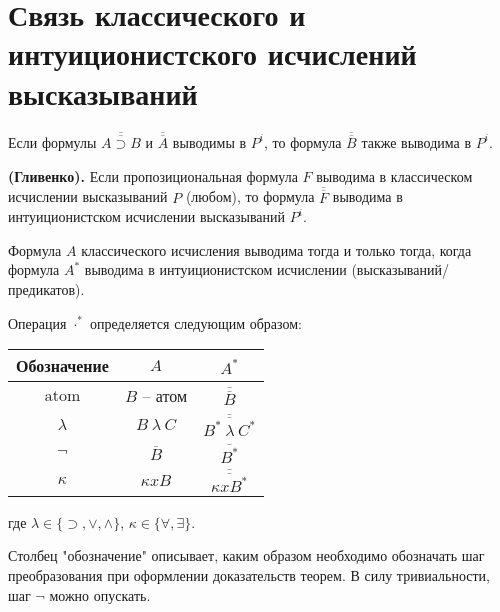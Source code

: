 \section{Связь классического и интуиционистского исчислений высказываний}

\begin{lemma}
    Если формулы $\overline{\overline{A \supset B}}$ и $\overline{\overline{A}}$ выводимы в $P^i$, то формула $\overline{\overline{B}}$ также выводима в $P^i$.
\end{lemma}

\begin{theorem}
    \textbf{(Гливенко).} Если пропозициональная формула $F$ выводима в классическом исчислении высказываний $P$ (любом), то формула $\overline{\overline{F}}$ выводима в интуиционистском исчислении высказываний $P^i$.
\end{theorem}

\begin{theorem}\label{BaseTheorem:IntuitTransform}
    Формула $A$ классического исчисления выводима тогда и только тогда, когда формула $A^*$ выводима в интуиционистском исчислении (высказываний/предикатов).

    Операция $\cdot^*$ определяется следующим образом:

    \begin{tabular}{|c|c|c|}
        \hline
        Обозначение &$A$ & $A^*$ \\
        \hline
        $\text{atom}$ &$B$ -- атом & $\overline{\overline{B}}$ \\
        $\lambda$ &$B \ \lambda\ C$ & $\overline{\overline{B^*\ \lambda\ C^*}}$ \\
        $\lnot$ & $\overline{B}$ & $\overline{B^*}$ \\
        $\kappa$ &$\kappa xB$ & $\overline{\overline{\kappa x B^*}}$ \\
        \hline
    \end{tabular}

    где $\lambda \in \{\supset, \lor, \land\}$, $\kappa \in \{\forall, \exists\}$.
\end{theorem}

\begin{remark}
    Столбец "обозначение" описывает, каким образом необходимо обозначать шаг преобразования при оформлении доказательств теорем. В силу тривиальности, шаг $\lnot$ можно опускать.
\end{remark}